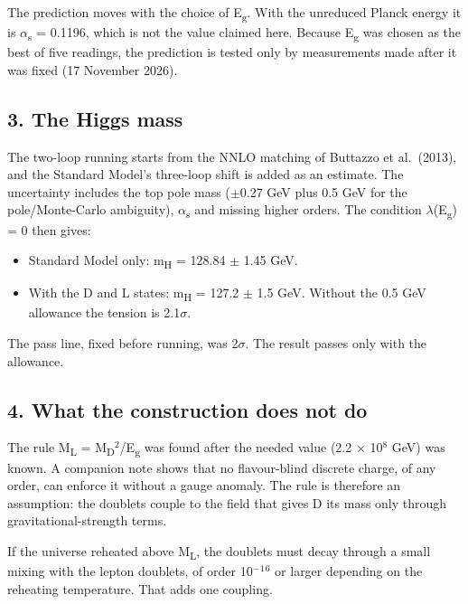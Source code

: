 \documentclass[
  11pt,
]{article}
\providecommand{\tightlist}{%
  \setlength{\itemsep}{0pt}\setlength{\parskip}{0pt}}
\begin{document}
The prediction moves with the choice of E\textsubscript{g}. With the unreduced Planck energy it is \ensuremath{\alpha}\textsubscript{s} = 0.1196, which is not the value claimed here. Because E\textsubscript{g} was chosen as the best of five readings, the prediction is tested only by measurements made after it was fixed (17 November 2026).

\hypertarget{the-higgs-mass}{%
\subsection{3. The Higgs mass}\label{the-higgs-mass}}

The two-loop running starts from the NNLO matching of Buttazzo et al.~(2013), and the Standard Model's three-loop shift is added as an estimate. The uncertainty includes the top pole mass (\ensuremath{\pm}0.27 GeV plus 0.5 GeV for the pole/Monte-Carlo ambiguity), \ensuremath{\alpha}\textsubscript{s} and missing higher orders. The condition \ensuremath{\lambda}(E\textsubscript{g}) = 0 then gives:

\begin{itemize}
\tightlist
\item
  Standard Model only: m\textsubscript{H} = 128.84 \ensuremath{\pm} 1.45 GeV.
\item
  With the D and L states: m\textsubscript{H} = 127.2 \ensuremath{\pm} 1.5 GeV. Without the 0.5 GeV allowance the tension is 2.1\ensuremath{\sigma}.
\end{itemize}

The pass line, fixed before running, was 2\ensuremath{\sigma}. The result passes only with the allowance.

\hypertarget{what-the-construction-does-not-do}{%
\subsection{4. What the construction does not do}\label{what-the-construction-does-not-do}}

The rule M\textsubscript{L} = M\textsubscript{D}\ensuremath{^{2}}/E\textsubscript{g} was found after the needed value (2.2 \ensuremath{\times} 10\ensuremath{^{8}} GeV) was known. A companion note shows that no flavour-blind discrete charge, of any order, can enforce it without a gauge anomaly. The rule is therefore an assumption: the doublets couple to the field that gives D its mass only through gravitational-strength terms.

If the universe reheated above M\textsubscript{L}, the doublets must decay through a small mixing with the lepton doublets, of order 10\ensuremath{^{-}}\ensuremath{^{1}}\ensuremath{^{6}} or larger depending on the reheating temperature. That adds one coupling.
\end{document}
